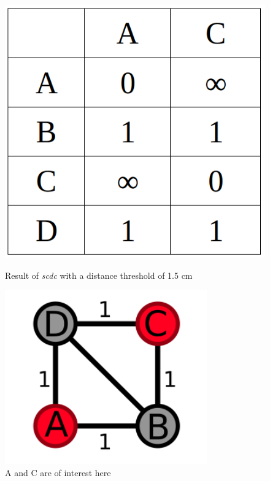 \begin{figure}[h]
	\centering
	\begin{minipage}[b]{0.56\textwidth}
		\includegraphics[width=\textwidth]{figures/distanceTableWithCanceldist.png}
		\caption{Result of \textit{scdc} with a distance threshold of 1.5 cm}
	\end{minipage}
	\hfill
	\begin{minipage}[b]{0.36\textwidth}
		\includegraphics[width=\textwidth]{figures/meshSCDC.png}
		\caption{A and C are of interest here}
	\end{minipage}
\end{figure}

